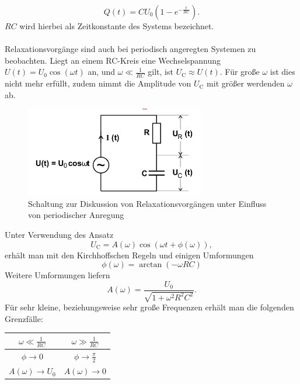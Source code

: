 \begin{equation}
	\label{eqn:entladung}
	Q(t)=CU_\text{0}(  1-e^{-\frac{t}{RC}} ) .
\end{equation}
$RC$ wird hierbei als Zeitkonstante des Systems bezeichnet.\\
\\Relaxationsvorgänge sind auch bei periodisch angeregten Systemen zu beobachten.
Liegt an einem RC-Kreis eine Wechselspannung $U(t)=U_\text{0}\cos(\omega t)$ an, und $\omega \ll \frac{1}{RC}$ gilt, ist $U_\text{C} \approx U(t)$.
Für große $\omega$ ist dies nicht mehr erfüllt, zudem nimmt die Amplitude von $U_\text{C}$ mit größer werdenden $\omega$ ab.
\begin{figure}
	\centering
	\includegraphics[width=0.7\textwidth]{bilder/periodisch.png}
	\caption{Schaltung zur Diskussion von Relaxationsvorgängen unter Einfluss von periodischer Anregung \cite{Anleitung}}
	\label{fig:periodisch}
\end{figure}
Unter Verwendung des Ansatz
\begin{equation*}
	U_\text{C}=A(\omega)\cos(\omega t +\phi(\omega)) ,
\end{equation*}
erhält man mit den Kirchhoffschen Regeln und einigen Umformungen
\begin{equation}
	\label{eqn:phase}
	\phi(\omega)=\arctan(-\omega RC)
\end{equation}
Weitere Umformungen liefern
\begin{equation}
	\label{eqn:amplitude}
	A(\omega)=\frac{U_\text{0}}{\sqrt{1+\omega ^2R^2C^2}} .
\end{equation}
Für sehr kleine, beziehungsweise sehr große Frequenzen erhält man die folgenden Grenzfälle:

\begin{table}
	\centering
	\label{tab:tab1}
	\begin{tabular}{cc}
		\toprule
		$\omega \ll \frac{1}{RC} $  & $ \omega \gg \frac{1}{RC}$ \\
		\midrule
		$\phi \to 0$                & $\phi \to \frac{\pi}{2}$   \\
		$A(\omega) \to U_\text{0} $ & $A(\omega) \to 0$          \\
		\bottomrule
	\end{tabular}
\end{table}

